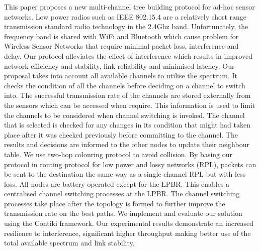 This paper proposes a new multi-channel tree building protocol for ad-hoc sensor networks. Low power radios such as IEEE 802.15.4 are a relatively short range transmission standard radio technology in the 2.4Ghz band. Unfortunately, the frequency band is shared with WiFi and Bluetooth which cause problem for Wireless Sensor Networks that require minimal packet loss, interference and delay. Our protocol alleviates the effect of interference which results in improved network efficiency and stability, link reliability and minimised latency. 
        Our proposal takes into account all available channels to utilise the spectrum. It checks the condition of all the channels before deciding on a channel to switch into. The successful transmission rate of the channels are stored externally from the sensors which can be accessed when require. This information is used to limit the channels to be considered when channel switching is invoked. The channel that is selected is checked for any changes in its condition that might had taken place after it was checked previously before committing to the channel. The results and decisions are informed to the other nodes to update their neighbour table. We use two-hop colouring protocol to avoid collision. 
	By basing our protocol in routing protocol for low power and lossy networks (RPL), packets can be sent to the destination the same way as a single channel RPL but with less loss. 
	All nodes are battery operated except for the LPBR. This enables a centralised channel switching processes at the LPBR. The channel switching processes take place after the topology is formed to further improve the transmission rate on the best paths.
	We implement and evaluate our solution using the Contiki framework. Our experimental results demonstrate an increased resilience to interference, significant higher throughput making better use of the total available spectrum and link stability. 
